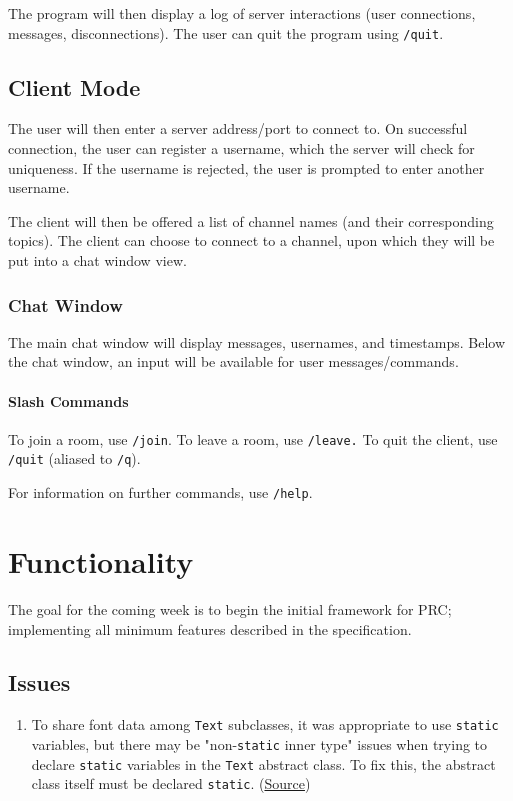 \documentclass{article}
\begin{document}
The program will then display a log of server interactions (user connections, messages, disconnections). The user can quit the program using \verb|/quit|.

\subsection{Client Mode}
The user will then enter a server address/port to connect to. On successful connection, the user can register a username, which the server will check for uniqueness. If the username is rejected, the user is prompted to enter another username.

The client will then be offered a list of channel names (and their corresponding topics). The client can choose to connect to a channel, upon which they will be put into a chat window view.


\subsubsection{Chat Window}
The main chat window will display messages, usernames, and timestamps. Below the chat window, an input will be available for user messages/commands.

\paragraph{Slash Commands}
To join a room, use \verb|/join|. To leave a room, use \verb|/leave.| To quit the client, use \verb|/quit| (aliased to \verb|/q|).

For information on further commands, use \verb|/help|.

\section{Functionality}
The goal for the coming week is to begin the initial framework for PRC; implementing all minimum features described in the specification.

\subsection{Issues}
\begin{enumerate}
    \item To share font data among \verb|Text| subclasses, it was appropriate to use \verb|static| variables, but there may be "non-\verb|static| inner type" issues when trying to declare \verb|static| variables in the \verb|Text| abstract class. To fix this, the abstract class itself must be declared \verb|static|. (\href{https://forum.processing.org/two/discussion/23623/when-creating-a-class-what-is-it-an-inner-class-of-declared-static-in-a-non-static-inner-type.html}{Source})
\end{enumerate}
\end{document}
